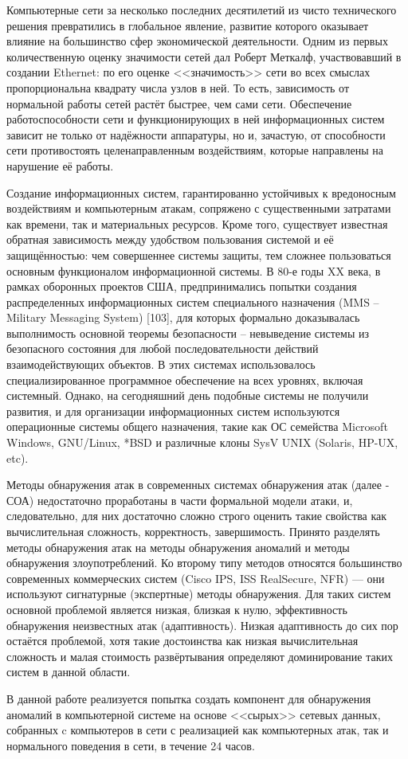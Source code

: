 Компьютерные сети за несколько последних десятилетий из чисто технического решения превратились в глобальное явление, развитие которого оказывает влияние на большинство сфер экономической деятельности. Одним из первых количественную оценку значимости сетей дал Роберт Меткалф, участвовавший в создании Ethernet: по его оценке <<значимость>> сети во всех смыслах пропорциональна квадрату числа узлов в ней. То есть, зависимость от нормальной работы сетей растёт быстрее, чем сами сети. Обеспечение работоспособности сети и функционирующих в ней информационных систем зависит не только от надёжности аппаратуры, но и, зачастую, от способности сети противостоять целенаправленным воздействиям, которые направлены на нарушение её работы.

Создание информационных систем, гарантированно устойчивых к вредоносным воздействиям и компьютерным атакам, сопряжено с существенными затратами как времени, так и материальных ресурсов. Кроме того, существует известная обратная зависимость между удобством пользования системой и её защищённостью: чем совершеннее системы защиты, тем сложнее пользоваться основным функционалом информационной системы. В 80-е годы XX века, в рамках оборонных проектов США, предпринимались попытки создания распределенных информационных систем специального назначения (MMS – Military Messaging System) [103], для которых формально доказывалась выполнимость основной теоремы безопасности – невыведение системы из безопасного состояния для любой последовательности действий взаимодействующих объектов. В этих системах использовалось специализированное программное обеспечение на всех уровнях, включая системный. Однако, на сегодняшний день подобные системы не получили развития, и для организации информационных систем используются операционные системы общего назначения, такие как ОС семейства Microsoft Windows, GNU/Linux, *BSD и различные клоны SysV UNIX (Solaris, HP-UX, etc).

Методы обнаружения атак в современных системах обнаружения атак (далее - СОА) недостаточно проработаны в части формальной модели атаки, и, следовательно, для них достаточно сложно строго оценить такие свойства как вычислительная сложность, корректность, завершимость. Принято разделять методы обнаружения атак на методы обнаружения аномалий и методы обнаружения злоупотреблений. Ко второму типу методов относятся большинство современных коммерческих систем (Cisco IPS, ISS RealSecure, NFR) --- они используют сигнатурные (экспертные) методы обнаружения. Для таких систем основной проблемой является низкая, близкая к нулю, эффективность обнаружения неизвестных атак (адаптивность). Низкая адаптивность до сих пор остаётся проблемой, хотя такие достоинства как низкая вычислительная сложность и малая стоимость развёртывания определяют доминирование таких систем в данной области.

В данной работе реализуется попытка создать компонент для обнаружения аномалий в компьютерной системе на основе <<сырых>> сетевых данных, собранных c компьютеров в сети с реализацией как компьютерных атак, так и нормального поведения в сети, в течение 24 часов.
